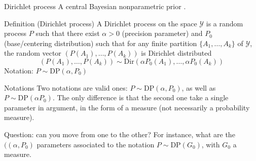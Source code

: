 \begin{frame}{Dirichlet process}
A central Bayesian nonparametric prior \citep{ferguson1973bayesian}.\pause

\begin{block}{Definition (Dirichlet process)}
A \alert{Dirichlet process} on the space $\mathcal{Y}$ is a random process $ P $ such that there exist $ \alpha>0 $ (precision parameter) and $ P_0 $ (base/centering distribution) \pause such that for any finite partition $ \{A_1,\ldots,A_k\} $ of $\mathcal{Y}$, the random vector
$ (P(A_1),\ldots,P(A_k)) $ is Dirichlet distributed
\[ (P(A_1),\ldots,P(A_k))\sim \text{Dir}(\alpha P_0(A_1),\ldots,\alpha P_0(A_k)) \]
\alert{Notation}: $ P \sim \text{DP}(\alpha, P_0) $
\end{block}
\begin{center}
\end{center}
\end{frame}

\begin{frame}{Notations}
	Two notations are valid ones: $ P \sim \text{DP}(\alpha, P_0) $, as well as $ P \sim \text{DP}(\alpha P_0) $. The only difference is that the second one take a single parameter in argument, in the form of a measure (not necessarily a probability measure). 
	
	\alert{Question}: can you move from one to the other? For instance, what are the  $((\alpha, P_0) $ parameters associated to the notation $ P \sim \text{DP}(G_0)$, with $G_0$ a measure.
\end{frame}

